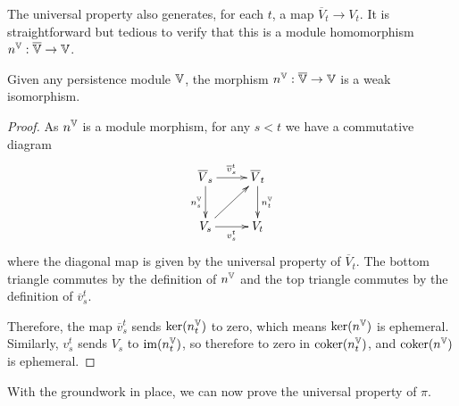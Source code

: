 The universal property also generates, for each $t$, a map $\overline V_t \to V_t$. It is straightforward but tedious to verify that this is a module homomorphism $n^{\mathbb{V}} : \overline {\mathbb{V}} \to \mathbb{V}$.

\begin{proposition}
Given any persistence module $\mathbb{V}$, the morphism $n^{\mathbb{V}} : \overline {\mathbb{V}} \to \mathbb{V}$ is a weak isomorphism.
\end{proposition}
\begin{proof}
As $n^{\mathbb{V}}$ is a module morphism, for any $s < t$ we have a commutative diagram
\begin{displaymath}
\xymatrix{
\overline V_s \ar[d]_{n^\V_s} \ar[r]^{\overline v_s^t} & \overline V_t \ar[d]^{n^\V_t}\\
V_s \ar[r]_{v_s^t} \ar[ur] & V_t
}
\end{displaymath}
where the diagonal map is given by the universal property of $\overline V_t$. The bottom triangle commutes by the definition of $n^{\mathbb{V}}$ and the top triangle commutes by the definition of $\overline v_s^t$.

Therefore, the map $\overline v_s^t$ sends $\ker(n^{\mathbb{V}}_t)$ to zero, which means $\ker(n^{\mathbb{V}})$ is ephemeral. Similarly, $v_s^t$ sends $V_s$ to $\operatorname{im}(n^{\mathbb{V}}_t)$, so therefore to zero in $\operatorname{coker}(n^{\mathbb{V}}_t)$, and $\operatorname{coker}(n^{\mathbb{V}})$ is ephemeral.
\end{proof}

With the groundwork in place, we can now prove the universal property of $\pi$.

